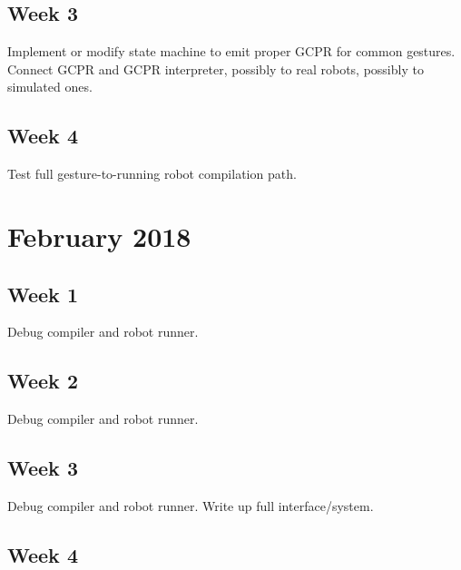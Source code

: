 \subsection{Week 3}

Implement or modify state machine to emit proper GCPR for common gestures. 
Connect GCPR and GCPR interpreter, possibly to real robots, possibly to simulated ones. 
 
\subsection{Week 4}

Test full gesture-to-running robot compilation path. 

\section{February 2018}


\subsection{Week 1}

Debug compiler and robot runner. 

\subsection{Week 2}

Debug compiler and robot runner. 

\subsection{Week 3}

Debug compiler and robot runner. 
Write up full interface/system. 

\subsection{Week 4}

